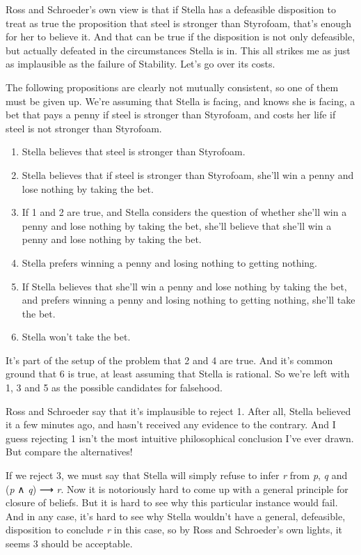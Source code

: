 \documentclass[
  11pt,
]{book}
\providecommand{\tightlist}{%
  \setlength{\itemsep}{0pt}\setlength{\parskip}{0pt}}
\begin{document}
Ross and Schroeder's own view is that if Stella has a defeasible disposition to treat as true the proposition that steel is stronger than Styrofoam, that's enough for her to believe it. And that can be true if the disposition is not only defeasible, but actually defeated in the circumstances Stella is in. This all strikes me as just as implausible as the failure of Stability. Let's go over its costs.

The following propositions are clearly not mutually consistent, so one of them must be given up. We're assuming that Stella is facing, and knows she is facing, a bet that pays a penny if steel is stronger than Styrofoam, and costs her life if steel is not stronger than Styrofoam.

\begin{enumerate}
\def\labelenumi{\arabic{enumi}.}
\tightlist
\item
  Stella believes that steel is stronger than Styrofoam.
\item
  Stella believes that if steel is stronger than Styrofoam, she'll win a penny and lose nothing by taking the bet.
\item
  If 1 and 2 are true, and Stella considers the question of whether she'll win a penny and lose nothing by taking the bet, she'll believe that she'll win a penny and lose nothing by taking the bet.
\item
  Stella prefers winning a penny and losing nothing to getting nothing.
\item
  If Stella believes that she'll win a penny and lose nothing by taking the bet, and prefers winning a penny and losing nothing to getting nothing, she'll take the bet.
\item
  Stella won't take the bet.
\end{enumerate}

It's part of the setup of the problem that 2 and 4 are true. And it's common ground that 6 is true, at least assuming that Stella is rational. So we're left with 1, 3 and 5 as the possible candidates for falsehood.

Ross and Schroeder say that it's implausible to reject 1. After all, Stella believed it a few minutes ago, and hasn't received any evidence to the contrary. And I guess rejecting 1 isn't the most intuitive philosophical conclusion I've ever drawn. But compare the alternatives!

If we reject 3, we must say that Stella will simply refuse to infer \emph{r} from \emph{p}, \emph{q} and (\emph{p} ∧ \emph{q}) ⟶ \emph{r}. Now it is notoriously hard to come up with a general principle for closure of beliefs. But it is hard to see why this particular instance would fail. And in any case, it's hard to see why Stella wouldn't have a general, defeasible, disposition to conclude \emph{r} in this case, so by Ross and Schroeder's own lights, it seems 3 should be acceptable.
\end{document}
